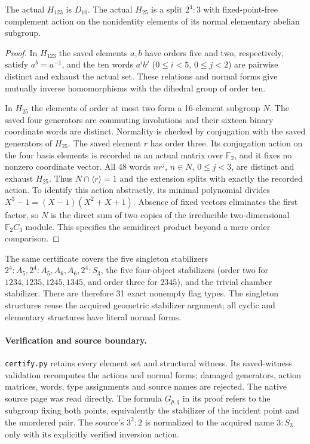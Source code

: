\documentclass[11pt]{article}
\begin{document}
\begin{lemma}
The actual $H_{123}$ is $D_{10}$. The actual $H_{25}$ is a split
$2^4:3$ with fixed-point-free complement action on the nonidentity
elements of its normal elementary abelian subgroup.
\end{lemma}
\begin{proof}
In $H_{123}$ the saved elements $a,b$ have orders five and two,
respectively, satisfy $a^b=a^{-1}$, and the ten words
$a^i b^j$ ($0\leq i<5$, $0\leq j<2$) are pairwise distinct and
exhaust the actual set. These relations and normal forms give mutually
inverse homomorphisms with the dihedral group of order ten.

In $H_{25}$ the elements of order at most two form a 16-element
subgroup $N$. The saved four generators are commuting involutions
and their sixteen binary coordinate words are distinct. Normality is
checked by conjugation with the saved generators of $H_{25}$.
The saved element $r$ has order three. Its conjugation action on the
four basis elements is recorded as an actual matrix over $\mathbb F_2$,
and it fixes no nonzero coordinate vector. All 48 words $nr^j$,
$n\in N$, $0\leq j<3$, are distinct and exhaust $H_{25}$.
Thus $N\cap\langle r\rangle=1$ and the extension splits with exactly
the recorded action. To identify this action abstractly, its minimal
polynomial divides $X^3-1=(X-1)(X^2+X+1)$. Absence of fixed vectors
eliminates the first factor, so $N$ is the direct sum of two copies
of the irreducible two-dimensional $\mathbb F_2 C_3$ module.
This specifies the semidirect product beyond a mere order comparison.
\end{proof}

The same certificate covers the five singleton stabilizers
$2^4:A_5,2^4:A_5,A_6,A_6,2^4:S_3$, the five four-object
stabilizers (order two for $1234,1235,1245,1345$, and order three
for $2345$), and the trivial chamber stabilizer. There are therefore
31 exact nonempty flag types. The singleton structures reuse the
acquired geometric stabilizer argument; all cyclic and elementary
structures have literal normal forms.

\paragraph{Verification and source boundary.}
\texttt{certify.py} retains every element set and structural witness.
Its saved-witness validation recomputes the actions and normal forms;
damaged generators, action matrices, words, type assignments and source
names are rejected. The native source page was read directly. The
formula $G_{p,q}$ in its proof refers to the subgroup fixing both
points, equivalently the stabilizer of the incident point and the
unordered pair. The source's $3^2:2$ is normalized to the acquired
name $3:S_3$ only with its explicitly verified inversion action.
\end{document}
